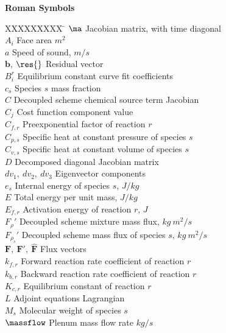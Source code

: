 
\begin{nomenclature}

\textbf{Roman Symbols}
\bigskip
\begin{tabbing}
  XXXXXXXXX \= \kill%
  $\ma$ \> Jacobian matrix, with time diagonal \\
  $A_i$ \> Face area $m^2$ \\
  $a$ \> Speed of sound, $m/s$ \\
  $\mathbf{b}$, $\res{}$ \> Residual vector \\
  $B^{r}_{i}$ \> Equilibrium constant curve fit coefficients \\
  $c_s$ \> Species $s$ mass fraction \\
  $C$ \> Decoupled scheme chemical source term Jacobian \\
  $C_j$ \> Cost function component value \\
  $C_{f,r}$ \> Preexponential factor of reaction $r$ \\
  $C_{p,s}$ \> Specific heat at constant pressure of species $s$ \\
  $C_{v,s}$ \> Specific heat at constant volume of species $s$ \\
  $D$ \> Decomposed diagonal Jacobian matrix \\
  $dv_1,\ dv_2,\ dv_3$ \> Eigenvector components \\
  $e_s$ \> Internal energy of species $s$, $J/kg$ \\
  $E$ \> Total energy per unit mass, $J/kg$ \\
  $E_{f,r}$\> Activation energy of reaction $r$, $J$ \\
  $F_\rho'$\> Decoupled scheme mixture mass flux, $kg\ m^2/s$ \\
  $F_{\rho_s}'$\> Decoupled scheme mass flux of species $s$, $kg\ m^2/s$ \\
  $\mathbf{F},\ \mathbf{F}',\ \mathbf{\hat{F}}$ \> Flux vectors \\
  $k_{f,r}$ \> Forward reaction rate coefficient of reaction $r$ \\
  $k_{b,r}$ \> Backward reaction rate coefficient of reaction $r$ \\
  $K_{c,r}$ \> Equilibrium constant of reaction $r$ \\
  $L$ \> Adjoint equations Lagrangian \\
  $M_s$ \> Molecular weight of species $s$ \\
  $\massflow$ \> Plenum mass flow rate $kg/s$ \\

\end{tabbing}
\end{nomenclature}
